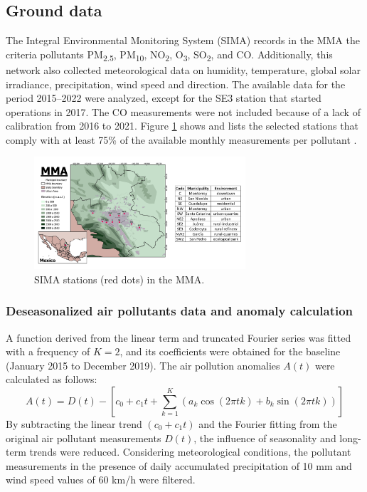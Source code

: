 \documentclass[sn-mathphys-num]{sn-jnl}
\begin{document}
\subsection{Ground data}
The Integral Environmental Monitoring System (SIMA) records in the MMA the criteria pollutants PM\textsubscript{2.5}, PM\textsubscript{10}, NO\textsubscript{2}, O\textsubscript{3}, SO\textsubscript{2}, and CO. Additionally, this network also collected meteorological data on humidity, temperature, global solar irradiance, precipitation, wind speed and direction. The available data for the period 2015--2022 were analyzed, except for the SE3 station that started operations in 2017. The CO measurements were not included because of a lack of calibration from 2016 to 2021. Figure \ref{596247} shows and lists the selected stations that comply with at least 75\% of the available monthly measurements per pollutant \citep{mtodos}.
\begin{figure}[H]
	\begin{center}
		\includegraphics[width=0.70\textwidth]{figures/amm_tabla.png}
		\caption{SIMA stations (red dots) in the MMA.
				{\label{596247}}}
	\end{center}
\end{figure}
\subsubsection{Deseasonalized air pollutants data and anomaly calculation}
A function derived from the linear term and truncated Fourier series was fitted with a frequency of \(K=2\), and its coefficients were obtained \citep{Hernandez-Paniagua2021} for the baseline (January 2015 to December 2019). The air pollution anomalies \(A\left(t\right)\) were calculated as follows:
\begin{equation}
	A\left(t\right)=D\left(t\right)-\left[c_0+c_1t+ \sum_{k=1}^{K}\left(a_{k}\cos(2\pi tk)+b_{k}\sin(2\pi tk)\right)\right]
	\label{eq:anomalies}
\end{equation}
By subtracting the linear trend \((c_{0}+c_{1}t)\) and the Fourier fitting from the original air pollutant measurements \(D(t)\), the influence of seasonality and long-term trends were reduced. Considering meteorological conditions, the pollutant measurements in the presence of daily accumulated precipitation of 10 mm and wind speed values of 60 km/h were filtered.
\end{document}
